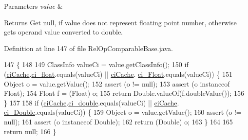 \begin{DoxyParams}{Parameters}
{\em value} & \\
\hline
\end{DoxyParams}
\begin{DoxyReturn}{Returns}
Get null, if value does not represent floating point number, otherwise gets operand value converted to double. 
\end{DoxyReturn}


Definition at line 147 of file Rel\+Op\+Comparable\+Base.\+java.


\begin{DoxyCode}
147                                                                                  \{
148 
149     ClassInfo valueCi = value.getClassInfo();
150     \textcolor{keywordflow}{if} (\hyperlink{classgov_1_1nasa_1_1jpf_1_1inspector_1_1server_1_1programstate_1_1relop_1_1_rel_op_comparable_base_a3bd22b88a44dff54d68b1d8a3e8f3d0a}{ciCache}.\hyperlink{classgov_1_1nasa_1_1jpf_1_1inspector_1_1utils_1_1_class_info_cache_a047975f4a6c537957243b2e5a009f4aa}{ci\_float}.equals(valueCi) || \hyperlink{classgov_1_1nasa_1_1jpf_1_1inspector_1_1server_1_1programstate_1_1relop_1_1_rel_op_comparable_base_a3bd22b88a44dff54d68b1d8a3e8f3d0a}{ciCache}.
      \hyperlink{classgov_1_1nasa_1_1jpf_1_1inspector_1_1utils_1_1_class_info_cache_a9ebf72e1a4190d413f91925f5a0d56a0}{ci\_Float}.equals(valueCi)) \{
151       Object o = value.getValue();
152       assert (o != null);
153       assert (o instanceof Float);
154       Float f = (Float) o;
155       \textcolor{keywordflow}{return} Double.valueOf(f.doubleValue());
156     \}
157 
158     \textcolor{keywordflow}{if} (\hyperlink{classgov_1_1nasa_1_1jpf_1_1inspector_1_1server_1_1programstate_1_1relop_1_1_rel_op_comparable_base_a3bd22b88a44dff54d68b1d8a3e8f3d0a}{ciCache}.\hyperlink{classgov_1_1nasa_1_1jpf_1_1inspector_1_1utils_1_1_class_info_cache_a6c235608a009075b8eca6c1b6790a056}{ci\_double}.equals(valueCi) || \hyperlink{classgov_1_1nasa_1_1jpf_1_1inspector_1_1server_1_1programstate_1_1relop_1_1_rel_op_comparable_base_a3bd22b88a44dff54d68b1d8a3e8f3d0a}{ciCache}.
      \hyperlink{classgov_1_1nasa_1_1jpf_1_1inspector_1_1utils_1_1_class_info_cache_a4dfcbcfdb6ef9b2061fb0532f281eeb8}{ci\_Double}.equals(valueCi)) \{
159       Object o = value.getValue();
160       assert (o != null);
161       assert (o instanceof Double);
162       \textcolor{keywordflow}{return} (Double) o;
163     \}
164 
165     \textcolor{keywordflow}{return} null;
166   \}
\end{DoxyCode}
